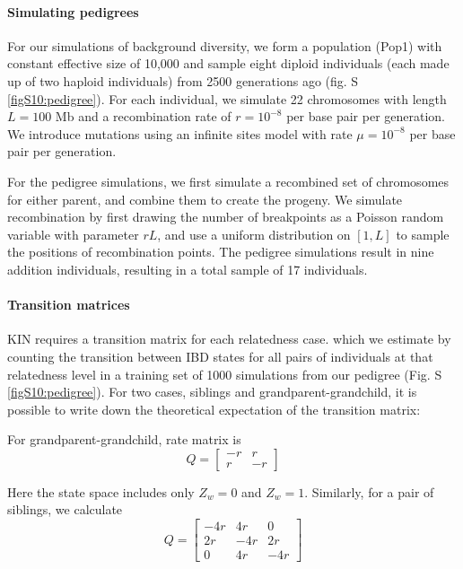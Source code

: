 \documentclass[12pt, letterpaper]{article}
\begin{document}
\paragraph{Simulating pedigrees}

For our simulations of background diversity, we form a population (Pop1) with constant effective size of 10,000 and sample eight diploid individuals (each made up of two haploid individuals) from 2500 generations ago (fig. S \ref{figS10:pedigree}). For each individual, we simulate 22 chromosomes with length $L=100$ Mb and a recombination rate of $r=10^{-8}$ per base pair per generation. We introduce mutations using an infinite sites model with rate  $\mu= 10^{-8}$ per base pair per generation. 

For the pedigree simulations, we first simulate a recombined set of chromosomes for either parent, and combine them to create the progeny. We simulate recombination by first drawing the number of breakpoints as a  Poisson random variable with parameter $rL$, and use a uniform distribution on $[1, L]$ to sample the positions of recombination points. The pedigree simulations result in nine addition individuals, resulting in a total sample of 17 individuals.

\paragraph{Transition matrices}
KIN requires a transition matrix for each relatedness case. which we estimate  by counting the transition between IBD states for all pairs of individuals at that relatedness level in a training set of 1000 simulations from our pedigree (Fig. S \ref{figS10:pedigree}). For two cases, siblings and grandparent-grandchild, it is possible to write down the theoretical expectation of the transition matrix: 

For grandparent-grandchild, rate matrix is
 $$Q = \left[\begin{array}
{rrr}
-r & r \\
r & -r 
\end{array}\right]$$   

Here the state space includes only $Z_w=0$ and $Z_w=1$. 
Similarly, for a pair of siblings, we calculate $$Q =  
\left[\begin{array}
{rrr}
-4r & 4r & 0\\
2r & -4r & 2r\\
0 & 4r & -4r
\end{array}\right]$$   
\end{document}
